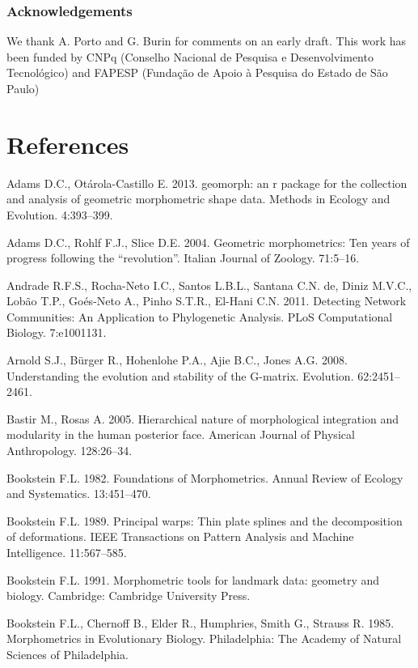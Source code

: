 \documentclass[12pt,]{article}
\begin{document}
\subsubsection{Acknowledgements}\label{acknowledgements}

We thank A. Porto and G. Burin for comments on an early draft. This work
has been funded by CNPq (Conselho Nacional de Pesquisa e Desenvolvimento
Tecnológico) and FAPESP (Fundação de Apoio à Pesquisa do Estado de São
Paulo)

\section*{References}\label{references}

Adams D.C., Otárola-Castillo E. 2013. geomorph: an r package for the
collection and analysis of geometric morphometric shape data. Methods in
Ecology and Evolution. 4:393--399.

Adams D.C., Rohlf F.J., Slice D.E. 2004. Geometric morphometrics: Ten
years of progress following the ``revolution''. Italian Journal of
Zoology. 71:5--16.

Andrade R.F.S., Rocha-Neto I.C., Santos L.B.L., Santana C.N. de, Diniz
M.V.C., Lobão T.P., Goés-Neto A., Pinho S.T.R., El-Hani C.N. 2011.
Detecting Network Communities: An Application to Phylogenetic Analysis.
PLoS Computational Biology. 7:e1001131.

Arnold S.J., Bürger R., Hohenlohe P.A., Ajie B.C., Jones A.G. 2008.
Understanding the evolution and stability of the G-matrix. Evolution.
62:2451--2461.

Bastir M., Rosas A. 2005. Hierarchical nature of morphological
integration and modularity in the human posterior face. American Journal
of Physical Anthropology. 128:26--34.

Bookstein F.L. 1982. Foundations of Morphometrics. Annual Review of
Ecology and Systematics. 13:451--470.

Bookstein F.L. 1989. Principal warps: Thin plate splines and the
decomposition of deformations. IEEE Transactions on Pattern Analysis and
Machine Intelligence. 11:567--585.

Bookstein F.L. 1991. Morphometric tools for landmark data: geometry and
biology. Cambridge: Cambridge University Press.

Bookstein F.L., Chernoff B., Elder R., Humphries, Smith G., Strauss R.
1985. Morphometrics in Evolutionary Biology. Philadelphia: The Academy
of Natural Sciences of Philadelphia.
\end{document}
